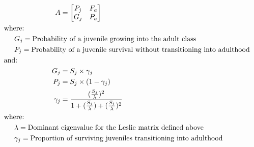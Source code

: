 \documentclass[12pt]{article}
\begin{document}
\begin{preview}
\begin{align}
A & =
\begin{bmatrix}
 P_{j} & F_{a} \nonumber \\ 
 G_{j} & P_{a} \nonumber \\ 
\end{bmatrix} \\
& \hspace{-1.1in} \text{where:} \nonumber \\
& \hspace{-0.9in} G_{j} = \text{Probability of a juvenile growing into the adult class} \nonumber \\
& \hspace{-0.9in} P_{j} = \text{Probability of a juvenile survival without transitioning into adulthood} \nonumber \\
& \hspace{-1.1in} \text{and:} \nonumber \\
G_{j} & = S_{j} \times \gamma_{j} \nonumber \\
P_{j} & = S_{j} \times (1 - \gamma_{j}) \nonumber \\
\gamma_{j} & = \frac{(\frac{S_{j}}{\lambda})^2}{1+(\frac{S_{j}}{\lambda})+(\frac{S_{j}}{\lambda})^2} \nonumber \\
& \hspace{-1.1in} \text{where:} \nonumber \\
& \hspace{-0.9in} \lambda = \text{Dominant eigenvalue for the Leslie matrix defined above} \nonumber \\
& \hspace{-0.9in} \gamma_{j} = \text{Proportion of surviving juveniles transitioning into adulthood} \nonumber
\end{align}
\end{preview}
\end{document}
